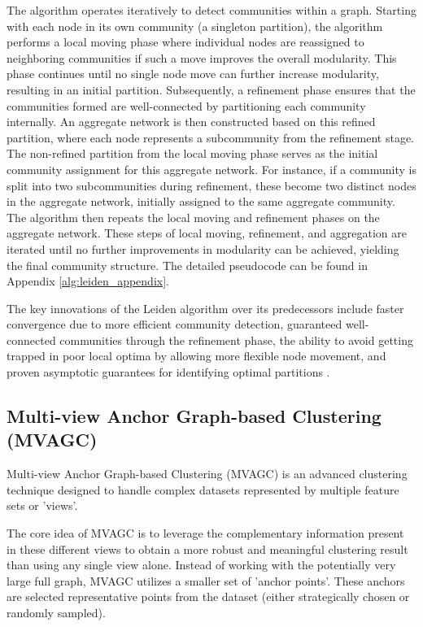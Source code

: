 The algorithm operates iteratively to detect communities within a graph. Starting with each node in its own community (a singleton partition), the algorithm performs a local moving phase where individual nodes are reassigned to neighboring communities if such a move improves the overall modularity. This phase continues until no single node move can further increase modularity, resulting in an initial partition. Subsequently, a refinement phase ensures that the communities formed are well-connected by partitioning each community internally. An aggregate network is then constructed based on this refined partition, where each node represents a subcommunity from the refinement stage. The non-refined partition from the local moving phase serves as the initial community assignment for this aggregate network. For instance, if a community is split into two subcommunities during refinement, these become two distinct nodes in the aggregate network, initially assigned to the same aggregate community. The algorithm then repeats the local moving and refinement phases on the aggregate network. These steps of local moving, refinement, and aggregation are iterated until no further improvements in modularity can be achieved, yielding the final community structure. The detailed pseudocode can be found in Appendix \ref{alg:leiden_appendix}.

The key innovations of the Leiden algorithm over its predecessors include faster convergence due to more efficient community detection, guaranteed well-connected communities through the refinement phase, the ability to avoid getting trapped in poor local optima by allowing more flexible node movement, and proven asymptotic guarantees for identifying optimal partitions \cite{traag2019leiden}.


\subsection{Multi-view Anchor Graph-based Clustering (MVAGC)}
\label{subsec:MVAGC}

Multi-view Anchor Graph-based Clustering (MVAGC) is an advanced clustering technique designed to handle complex datasets represented by multiple feature sets or 'views'. 

The core idea of MVAGC is to leverage the complementary information present in these different views to obtain a more robust and meaningful clustering result than using any single view alone. Instead of working with the potentially very large full graph, MVAGC utilizes a smaller set of 'anchor points'. These anchors are selected representative points from the dataset (either strategically chosen or randomly sampled).


